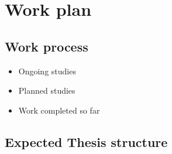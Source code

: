 \chapter{Work plan}

\section{Work process}
\begin{itemize}
    \item Ongoing studies
    \item Planned studies
    \item Work completed so far
\end{itemize}

\section{Expected Thesis structure}
